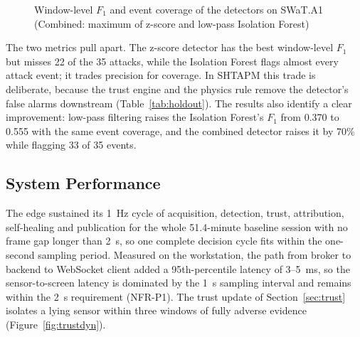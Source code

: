 \begin{figure}[htbp]
\centering
{}
\caption{Window-level $F_1$ and event coverage of the detectors on SWaT.A1 (Combined: maximum of z-score and low-pass Isolation Forest)}
\label{fig:swat}
\end{figure}

The two metrics pull apart. The z-score detector has the best window-level $F_1$ but misses 22 of the 35 attacks, while the Isolation Forest flags almost every attack event; it trades precision for coverage. In SHTAPM this trade is deliberate, because the trust engine and the physics rule remove the detector's false alarms downstream (Table~\ref{tab:holdout}). The results also identify a clear improvement: low-pass filtering raises the Isolation Forest's $F_1$ from 0.370 to 0.555 with the same event coverage, and the combined detector raises it by 70\% while flagging 33 of 35 events.

\subsection{System Performance}

The edge sustained its 1~Hz cycle of acquisition, detection, trust, attribution, self-healing and publication for the whole 51.4-minute baseline session with no frame gap longer than 2~s, so one complete decision cycle fits within the one-second sampling period. Measured on the workstation, the path from broker to backend to WebSocket client added a 95th-percentile latency of 3--5~ms, so the sensor-to-screen latency is dominated by the 1~s sampling interval and remains within the 2~s requirement (NFR-P1). The trust update of Section~\ref{sec:trust} isolates a lying sensor within three windows of fully adverse evidence (Figure~\ref{fig:trustdyn}).

